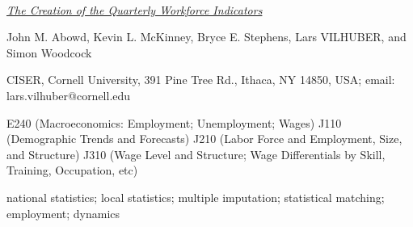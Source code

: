 \documentclass[10pt]{article}
\newcommand{\mytitle}{The Creation of the Quarterly Workforce Indicators }
\newcommand{\myauthors}{John M. Abowd, Kevin L. McKinney, Bryce
  E. Stephens, Lars VILHUBER, and Simon Woodcock}
\begin{document}
\ \\
\begin{description}
\item 
\item[\bf Title:] \underline{\it \mytitle}
\item[\bf Authors:]\myauthors
\item[{\bf Presenting author's address}:]
CISER, Cornell University, 391 Pine Tree Rd., Ithaca, NY 14850,  USA; 
email: lars.vilhuber@cornell.edu\\
\item[\bf Abstract :]

\item[{\bf JEL}:] E240 (Macroeconomics: Employment; Unemployment; Wages) J110
(Demographic Trends and Forecasts) J210 (Labor Force and Employment, Size,
and Structure) J310 (Wage Level and Structure; Wage Differentials by Skill,
Training, Occupation, etc) 
\item[{\bf Keywords}:] national statistics; local statistics; multiple imputation; statistical
matching; employment; dynamics
\end{description}
\end{document}
